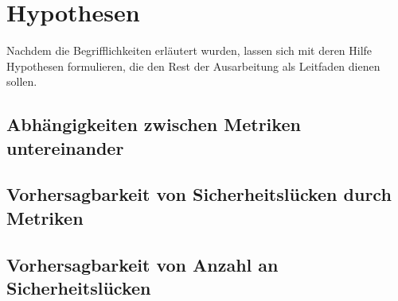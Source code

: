 \section{Hypothesen}
\label{sec:hypothesen}
Nachdem die Begrifflichkeiten erläutert wurden, lassen sich mit deren Hilfe Hypothesen formulieren, die den Rest der Ausarbeitung als Leitfaden dienen sollen.

\subsection{Abhängigkeiten zwischen Metriken untereinander}

\subsection{Vorhersagbarkeit von Sicherheitslücken durch Metriken}

\subsection{Vorhersagbarkeit von Anzahl an Sicherheitslücken}
